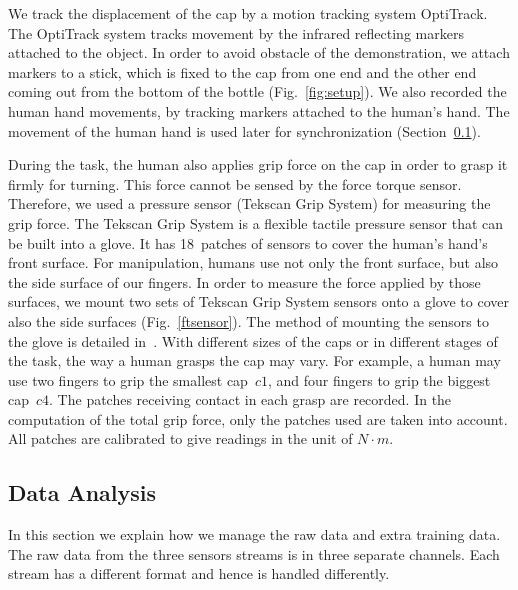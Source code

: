 We track the displacement of the cap by a motion tracking system
OptiTrack. The OptiTrack system tracks movement by the infrared
reflecting markers attached to the object. In order to avoid obstacle
of the demonstration, we attach markers to a stick, which is fixed to
the cap from one end and the other end coming out from the bottom of
the bottle (Fig.~\ref{fig:setup}). We also recorded the human hand
movements, by tracking markers attached to the human's hand. The
movement of the human hand is used later for synchronization
(Section~\ref{dataanalysis}).

During the task, the human also applies grip force on the cap in order
to grasp it firmly for turning. This force cannot be sensed by the
force torque sensor. Therefore, we used a pressure sensor (Tekscan
Grip System) for measuring the grip force. The Tekscan Grip System is
a flexible tactile pressure sensor that can be built into a glove. It
has 18~patches of sensors to cover the human's hand's front
surface. For manipulation, humans use not only the front surface, but
also the side surface of our fingers. In order to measure the force
applied by those surfaces, we mount two sets of Tekscan Grip System
sensors onto a glove to cover also the side surfaces
(Fig.~\ref{ftsensor}). The method of mounting the sensors to the glove
is detailed in~\citep{deSouza2014}. With different sizes of the caps
or in different stages of the task, the way a human grasps the cap may
vary.  For example, a human may use two fingers to grip the smallest
cap~$c1$, and four fingers to grip the biggest cap~$c4$. The patches
receiving contact in each grasp are recorded. In the computation of
the total grip force, only the patches used are taken into
account. All patches are calibrated to give readings in the unit of
$N{\cdot}m$.


\subsection{Data Analysis}
\label{dataanalysis}
In this section we explain how we manage the raw data and extra
training data.  The raw data from the three sensors streams is in
three separate channels. Each stream has a different format and hence
is handled differently.

